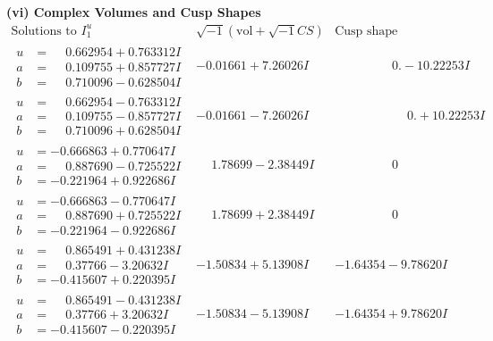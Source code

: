 \documentclass[1p]{elsarticle_modified}
\theoremstyle{definition}
\newcommand{\I}{\sqrt{-1}}
\begin{document}
\newpage\flushleft \textbf{(vi) Complex Volumes and Cusp Shapes}
$$\begin{array}{c|c|c}  
\text{Solutions to }I^u_{1}& \I (\text{vol} + \sqrt{-1}CS) & \text{Cusp shape}\\
 \hline 
\begin{aligned}
u &= \phantom{-}0.662954 + 0.763312 I \\
a &= \phantom{-}0.109755 + 0.857727 I \\
b &= \phantom{-}0.710096 - 0.628504 I\end{aligned}
 & -0.01661 + 7.26026 I & \phantom{-0.000000 } 0. - 10.22253 I \\ \hline\begin{aligned}
u &= \phantom{-}0.662954 - 0.763312 I \\
a &= \phantom{-}0.109755 - 0.857727 I \\
b &= \phantom{-}0.710096 + 0.628504 I\end{aligned}
 & -0.01661 - 7.26026 I & \phantom{-0.000000 -}0. + 10.22253 I \\ \hline\begin{aligned}
u &= -0.666863 + 0.770647 I \\
a &= \phantom{-}0.887690 - 0.725522 I \\
b &= -0.221964 + 0.922686 I\end{aligned}
 & \phantom{-}1.78699 - 2.38449 I & \phantom{-0.000000 } 0 \\ \hline\begin{aligned}
u &= -0.666863 - 0.770647 I \\
a &= \phantom{-}0.887690 + 0.725522 I \\
b &= -0.221964 - 0.922686 I\end{aligned}
 & \phantom{-}1.78699 + 2.38449 I & \phantom{-0.000000 } 0 \\ \hline\begin{aligned}
u &= \phantom{-}0.865491 + 0.431238 I \\
a &= \phantom{-}0.37766 - 3.20632 I \\
b &= -0.415607 + 0.220395 I\end{aligned}
 & -1.50834 + 5.13908 I & -1.64354 - 9.78620 I \\ \hline\begin{aligned}
u &= \phantom{-}0.865491 - 0.431238 I \\
a &= \phantom{-}0.37766 + 3.20632 I \\
b &= -0.415607 - 0.220395 I\end{aligned}
 & -1.50834 - 5.13908 I & -1.64354 + 9.78620 I \\ \hline\begin{aligned}

\end{aligned}
\end{array}$$
\end{document}
